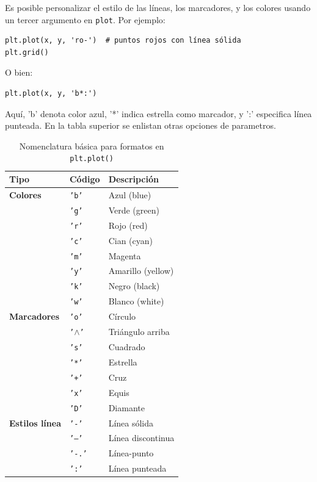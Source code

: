 \documentclass{article}
\theoremstyle{nonumberplain}
\begin{document}
Es posible personalizar el estilo de las líneas, los marcadores, y los colores usando un tercer argumento en \texttt{plot}. Por ejemplo:

\begin{verbatim}
plt.plot(x, y, 'ro-')  # puntos rojos con línea sólida
plt.grid()
\end{verbatim}

O bien:

\begin{verbatim}
plt.plot(x, y, 'b*:')
\end{verbatim}

Aquí, 'b' denota color azul, '*' indica estrella como marcador, y ':' especifica línea punteada. En la tabla superior se enlistan otras opciones de parametros.
\begin{table}[h]
\centering
\caption{Nomenclatura básica para formatos en \texttt{plt.plot()}}
\label{tab:plot_format}
\begin{tabular}{@{}lll@{}}
\toprule
\textbf{Tipo} & \textbf{Código} & \textbf{Descripción} \\
\midrule
\rowcolor{blue!10}
\textbf{Colores} & \texttt{'b'} & Azul (blue) \\
\rowcolor{blue!10} & \texttt{'g'} & Verde (green) \\
\rowcolor{blue!10} & \texttt{'r'} & Rojo (red) \\
\rowcolor{blue!10} & \texttt{'c'} & Cian (cyan) \\
\rowcolor{blue!10} & \texttt{'m'} & Magenta \\
\rowcolor{blue!10} & \texttt{'y'} & Amarillo (yellow) \\
\rowcolor{blue!10} & \texttt{'k'} & Negro (black) \\
\rowcolor{blue!10} & \texttt{'w'} & Blanco (white) \\
\midrule
\rowcolor{green!10}
\textbf{Marcadores} & \texttt{'o'} & Círculo \\
\rowcolor{green!10} & \texttt{'$\wedge$'} & Triángulo arriba \\  %
\rowcolor{green!10} & \texttt{'s'} & Cuadrado \\
\rowcolor{green!10} & \texttt{'*'} & Estrella \\
\rowcolor{green!10} & \texttt{'+'} & Cruz \\
\rowcolor{green!10} & \texttt{'x'} & Equis \\
\rowcolor{green!10} & \texttt{'D'} & Diamante \\
\midrule
\rowcolor{red!10}
\textbf{Estilos línea} & \texttt{'-'} & Línea sólida \\
\rowcolor{red!10} & \texttt{'--'} & Línea discontinua \\
\rowcolor{red!10} & \texttt{'-.'} & Línea-punto \\
\rowcolor{red!10} & \texttt{':'} & Línea punteada \\
\bottomrule
\end{tabular}
\end{table}
\end{document}
